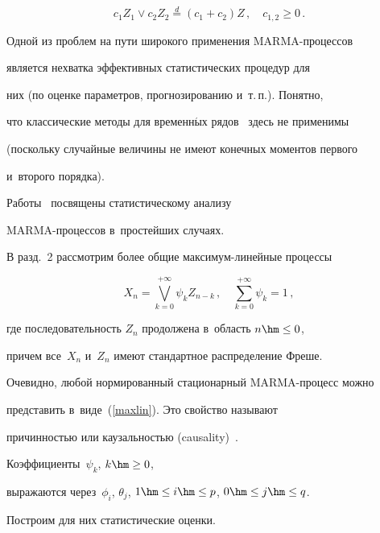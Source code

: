 \begin{equation}\label{maxstable}


c_1Z_1\vee c_2Z_2\stackrel{d}{=}\left(c_1+c_2\right)Z\,,\quad c_{1,2}\ge 0\,.


\end{equation}





Одной из проблем на пути широкого применения MARMA-про\-цес\-сов


является нехватка эффективных статистических процедур для


них (по оценке параметров, прогнозированию и~т.\,п.). Понятно,


что классические методы для временн$\acute{\mbox{ы}}$х рядов~\cite{BJ} здесь не применимы


(поскольку случайные величины не имеют конечных моментов первого


и~второго порядка).





Работы~\cite{DR2, Ferr, Leb1, Leb2} посвящены статистическому анализу


MARMA-про\-цес\-сов в~простейших случаях.





В разд.~2 рассмотрим более общие мак\-си\-мум-ли\-ней\-ные процессы


\begin{equation}\label{maxlin}


X_n=\bigvee_{k=0}^{+\infty}\psi_kZ_{n-k}\,,\quad \sum\limits_{k=0}^{+\infty}\psi_k=1\,,


\end{equation}


где последовательность $Z_n$ продолжена в~область $n\hm\le 0$,


причем все~$X_n$ и~$Z_n$ имеют стандартное распределение Фреше.


Очевидно, любой нормированный стационарный MARMA-про\-цесс можно


представить в~виде~(\ref{maxlin}). Это свойство называют


причинностью или каузальностью (causality)~\cite{DR1}.


Коэффициенты~$\psi_k$, $k\hm\ge 0$,


выражаются через~$\phi_i$, $\theta_j$, $1\hm\le i\hm\le p$, $0\hm\le j\hm\le q$.


Построим для них статистические оценки.





